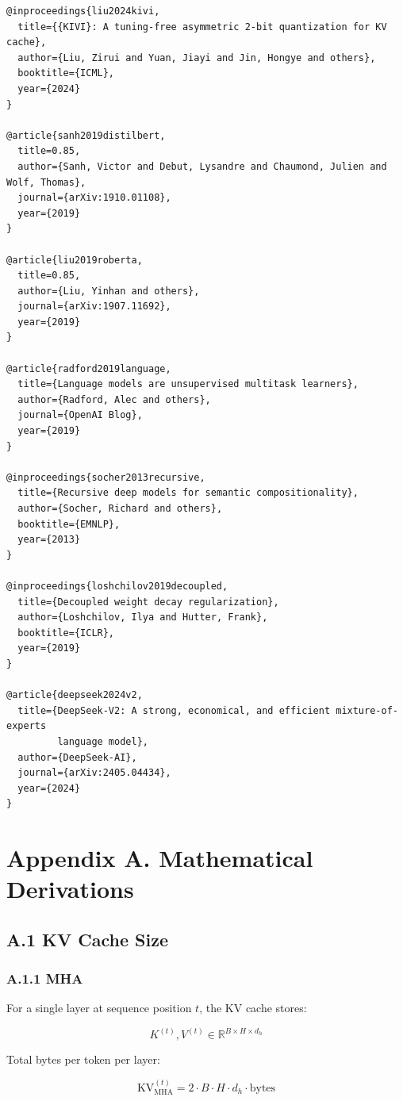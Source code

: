 \begin{lstlisting}
@inproceedings{liu2024kivi,
  title={{KIVI}: A tuning-free asymmetric 2-bit quantization for KV cache},
  author={Liu, Zirui and Yuan, Jiayi and Jin, Hongye and others},
  booktitle={ICML},
  year={2024}
}

@article{sanh2019distilbert,
  title=0.85,
  author={Sanh, Victor and Debut, Lysandre and Chaumond, Julien and Wolf, Thomas},
  journal={arXiv:1910.01108},
  year={2019}
}

@article{liu2019roberta,
  title=0.85,
  author={Liu, Yinhan and others},
  journal={arXiv:1907.11692},
  year={2019}
}

@article{radford2019language,
  title={Language models are unsupervised multitask learners},
  author={Radford, Alec and others},
  journal={OpenAI Blog},
  year={2019}
}

@inproceedings{socher2013recursive,
  title={Recursive deep models for semantic compositionality},
  author={Socher, Richard and others},
  booktitle={EMNLP},
  year={2013}
}

@inproceedings{loshchilov2019decoupled,
  title={Decoupled weight decay regularization},
  author={Loshchilov, Ilya and Hutter, Frank},
  booktitle={ICLR},
  year={2019}
}

@article{deepseek2024v2,
  title={DeepSeek-V2: A strong, economical, and efficient mixture-of-experts 
         language model},
  author={DeepSeek-AI},
  journal={arXiv:2405.04434},
  year={2024}
}
\end{lstlisting}


\section{Appendix A. Mathematical Derivations}

\subsection{A.1 KV Cache Size}

\subsubsection{A.1.1 MHA}

For a single layer at sequence position $t$, the KV cache stores:

\[
K^{(t)}, V^{(t)} \in \mathbb{R}^{B \times H \times d_h}
\tag{A.1}
\]

Total bytes per token per layer:

\[
\text{KV}^{(t)}_\text{MHA} = 2 \cdot B \cdot H \cdot d_h \cdot \text{bytes}
\tag{A.2}
\]

